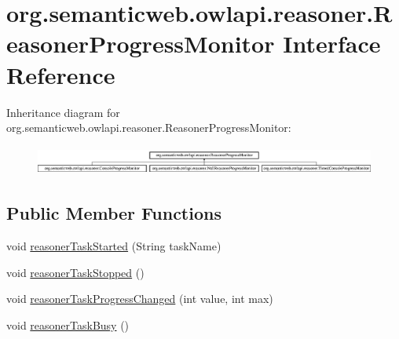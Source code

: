 \hypertarget{interfaceorg_1_1semanticweb_1_1owlapi_1_1reasoner_1_1_reasoner_progress_monitor}{\section{org.\-semanticweb.\-owlapi.\-reasoner.\-Reasoner\-Progress\-Monitor Interface Reference}
\label{interfaceorg_1_1semanticweb_1_1owlapi_1_1reasoner_1_1_reasoner_progress_monitor}
}
Inheritance diagram for org.\-semanticweb.\-owlapi.\-reasoner.\-Reasoner\-Progress\-Monitor\-:\begin{figure}[H]
\begin{center}
\leavevmode
\includegraphics[height=0.964686cm]{interfaceorg_1_1semanticweb_1_1owlapi_1_1reasoner_1_1_reasoner_progress_monitor}
\end{center}
\end{figure}
\subsection*{Public Member Functions}
\begin{DoxyCompactItemize}
\item 
void \hyperlink{interfaceorg_1_1semanticweb_1_1owlapi_1_1reasoner_1_1_reasoner_progress_monitor_a2153ef0672a0a5ab739b4b06cb8fb951}{reasoner\-Task\-Started} (String task\-Name)
\item 
void \hyperlink{interfaceorg_1_1semanticweb_1_1owlapi_1_1reasoner_1_1_reasoner_progress_monitor_a6a346505e16c27c18be7bab7a57bc6c0}{reasoner\-Task\-Stopped} ()
\item 
void \hyperlink{interfaceorg_1_1semanticweb_1_1owlapi_1_1reasoner_1_1_reasoner_progress_monitor_a042cacc59288fcb307507f127d84bcba}{reasoner\-Task\-Progress\-Changed} (int value, int max)
\item 
void \hyperlink{interfaceorg_1_1semanticweb_1_1owlapi_1_1reasoner_1_1_reasoner_progress_monitor_af6f37458664f7f2ca3df097a42f6eb23}{reasoner\-Task\-Busy} ()
\end{DoxyCompactItemize}
